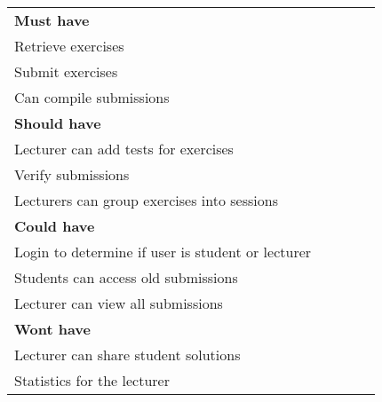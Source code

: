 \begin{table}[H]
    \begin{tabular}{|l|llll}
    \cline{1-1}
    \cellcolor[HTML]{C0C0C0}\textbf{Must have}        &  &  &  &  \\ \cline{1-1}
    Retrieve exercises                                &  &  &  &  \\ \cline{1-1}
    Submit exercises                                  &  &  &  &  \\ \cline{1-1}
    Can compile submissions                           &  &  &  &  \\ \cline{1-1}
    \cellcolor[HTML]{C0C0C0}\textbf{Should have}      &  &  &  &  \\ \cline{1-1}
    Lecturer can add tests for exercises              &  &  &  &  \\ \cline{1-1}
    Verify submissions                                &  &  &  &  \\ \cline{1-1}
    Lecturers can group exercises into sessions       &  &  &  &  \\ \cline{1-1}
    \cellcolor[HTML]{C0C0C0}\textbf{Could have}       &  &  &  &  \\ \cline{1-1}
    Login to determine if user is student or lecturer &  &  &  &  \\ \cline{1-1}
    Students can access old submissions               &  &  &  &  \\ \cline{1-1}
    Lecturer can view all submissions                 &  &  &  &  \\ \cline{1-1}
    \cellcolor[HTML]{C0C0C0}\textbf{Wont have}        &  &  &  &  \\ \cline{1-1}
    Lecturer can share student solutions              &  &  &  &  \\ \cline{1-1}
    Statistics for the lecturer                       &  &  &  &  \\ \cline{1-1}
    \end{tabular}
    \end{table}




    
    
